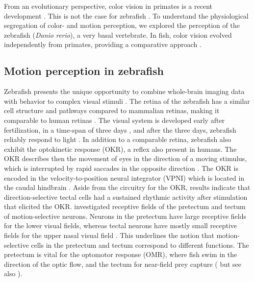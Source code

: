 From an evolutionary perspective, color vision in primates is a recent development \parencite{yokoyama2001colorvisongen}. This is not the case for zebrafish \parencite{BADEN2021R807}. To understand the physiological segregation of color- and motion perception, we explored the perception of the zebrafish (\textit{Danio rerio}), a very basal vertebrate. In fish, color vision evolved independently from primates, providing a comparative approach \parencite{nigel1967fishretina}. 

\subsection{Motion perception in zebrafish}

Zebrafish presents the unique opportunity to combine whole-brain imaging data with behavior to complex visual stimuli \parencite{bollmannZebrafishVisualSystem2019}. The retina of the zebrafish has a similar cell structure and pathways compared to mammalian retinas, making it comparable to human retinas \parencite{bollmannZebrafishVisualSystem2019}. The visual system is developed early after fertilization, in a time-span of three days \parencite{stuermer1988retinotopic}, and after the three days, zebrafish reliably respond to light \parencite{zhang2010development}. In addition to a comparable retina, zebrafish also exhibit the optokinetic response (OKR), a reflex also present in humans. The OKR describes then the movement of eyes in the direction of a moving stimulus, which is interrupted by rapid saccades in the opposite direction \parencite{brockerhoff1995behavioral}. The OKR is encoded in the velocity-to-position neural integrator (VPNI) which is located in the caudal hindbrain \parencite{miri2011regression, miri2011spatial}. Aside from the circuitry for the OKR, \textcite{perez2016sustained} results indicate that direction-selective tectal cells had a sustained rhythmic activity after stimulation that elicited the OKR. \textcite{wangParallelChannelsMotion2020} investigated receptive fields of the pretectum and tectum of motion-selective neurons. Neurons in the pretectum have large receptive fields for the lower visual fields, whereas tectal neurons have mostly small receptive fields for the upper nasal visual field \parencite{wangParallelChannelsMotion2020}. This underlines the notion that motion-selective cells in the pretectum and tectum correspond to different functions. The pretectum is vital for the optomotor response (OMR), where fish swim in the direction of the optic flow, and the tectum for near-field prey capture (\cite{wangParallelChannelsMotion2020} but see also \cite{10.3389/fncir.2021.814128}). 

